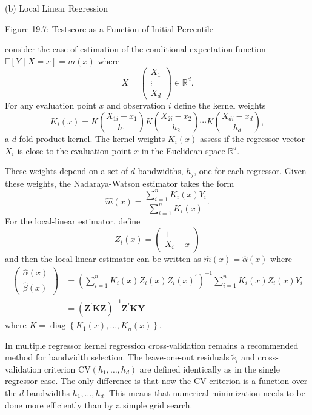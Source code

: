 \documentclass[10pt]{article}
\begin{document}
(b) Local Linear Regression

Figure 19.7: Testscore as a Function of Initial Percentile

consider the case of estimation of the conditional expectation function $\mathbb{E}[Y \mid X=x]=m(x)$ where
$$
X=\left(\begin{array}{c}
X_{1} \\
\vdots \\
X_{d}
\end{array}\right) \in \mathbb{R}^{d} .
$$
For any evaluation point $x$ and observation $i$ define the kernel weights
$$
K_{i}(x)=K\left(\frac{X_{1 i}-x_{1}}{h_{1}}\right) K\left(\frac{X_{2 i}-x_{2}}{h_{2}}\right) \cdots K\left(\frac{X_{d i}-x_{d}}{h_{d}}\right),
$$
a $d$-fold product kernel. The kernel weights $K_{i}(x)$ assess if the regressor vector $X_{i}$ is close to the evaluation point $x$ in the Euclidean space $\mathbb{R}^{d}$.

These weights depend on a set of $d$ bandwidths, $h_{j}$, one for each regressor. Given these weights, the Nadaraya-Watson estimator takes the form
$$
\widehat{m}(x)=\frac{\sum_{i=1}^{n} K_{i}(x) Y_{i}}{\sum_{i=1}^{n} K_{i}(x)} .
$$
For the local-linear estimator, define
$$
Z_{i}(x)=\left(\begin{array}{c}
1 \\
X_{i}-x
\end{array}\right)
$$
and then the local-linear estimator can be written as $\widehat{m}(x)=\widehat{\alpha}(x)$ where
$$
\begin{aligned}
\left(\begin{array}{c}
\widehat{\alpha}(x) \\
\widehat{\beta}(x)
\end{array}\right) &=\left(\sum_{i=1}^{n} K_{i}(x) Z_{i}(x) Z_{i}(x)^{\prime}\right)^{-1} \sum_{i=1}^{n} K_{i}(x) Z_{i}(x) Y_{i} \\
&=\left(\boldsymbol{Z}^{\prime} \boldsymbol{K} \boldsymbol{Z}\right)^{-1} \boldsymbol{Z}^{\prime} \boldsymbol{K} \boldsymbol{Y}
\end{aligned}
$$
where $K=\operatorname{diag}\left\{K_{1}(x), \ldots, K_{n}(x)\right\}$.

In multiple regressor kernel regression cross-validation remains a recommended method for bandwidth selection. The leave-one-out residuals $\widetilde{e}_{i}$ and cross-validation criterion $\mathrm{CV}\left(h_{1}, \ldots, h_{d}\right)$ are defined identically as in the single regressor case. The only difference is that now the CV criterion is a function over the $d$ bandwidths $h_{1}, \ldots, h_{d}$. This means that numerical minimization needs to be done more efficiently than by a simple grid search.
\end{document}
